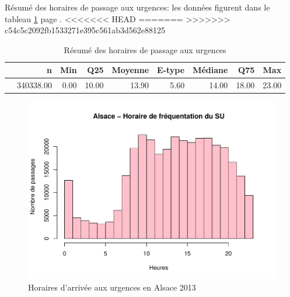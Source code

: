 \documentclass[12pt,english,french,twoside]{book}\usepackage[]{graphicx}\usepackage[]{color}
\makeatletter
\def\maxwidth{ %
  \ifdim\Gin@nat@width>\linewidth
    \linewidth
  \else
    \Gin@nat@width
  \fi
}
\newenvironment{knitrout}{}{} %
\makeatother
\begin{document}
Résumé des horaires de passage aux urgences: les données figurent dans le tableau \ref{tab:24} page \pageref{tab:24}.
<<<<<<< HEAD
=======
>>>>>>> c54c5c2092fb1533271e395c561ab3d562e88125
\begin{table}[ht]
\centering
\begin{tabular}{rrrrrrrrr}
  \hline
 & n & Min & Q25 & Moyenne & E-type & Médiane & Q75 & Max \\ 
  \hline
 & 340338.00 & 0.00 & 10.00 & 13.90 & 5.60 & 14.00 & 18.00 & 23.00 \\ 
   \hline
\end{tabular}
\caption[horaires de passage]{Résumé des horaires de passage aux urgences} 
\label{tab:24}
\end{table}



% 

\begin{figure}
\begin{center}
\begin{knitrout}
\color{fgcolor}
\includegraphics[width=\maxwidth]{figure/test23} 

\end{knitrout}

\end{center}
\caption{Horaires d'arrivée aux urgences en Alsace 2013}
\label{passage:als}
\end{figure}
\end{document}
